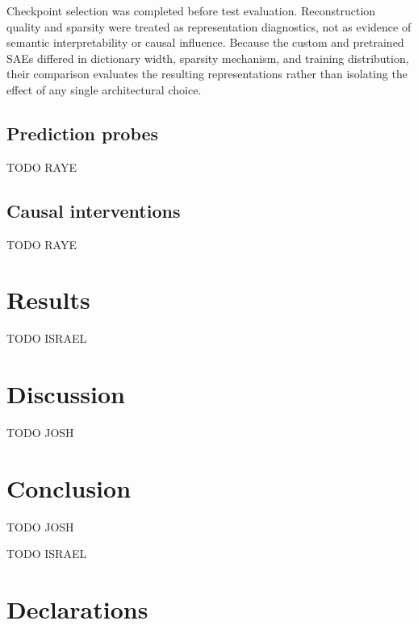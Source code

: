 \documentclass[pdflatex,sn-mathphys-num]{sn-jnl}
\theoremstyle{thmstylethree}%
\begin{document}
Checkpoint selection was completed before test evaluation. Reconstruction quality and sparsity were treated as representation diagnostics, not as evidence of semantic interpretability or 
causal influence. Because the custom and pretrained SAEs differed in dictionary width, sparsity mechanism, and training distribution, their comparison evaluates the resulting representations rather
than isolating the effect of any single architectural choice.

\subsection{Prediction probes}\label{subsec:probes}

TODO RAYE

\subsection{Causal interventions}\label{subsec:interventions}

TODO RAYE

\section{Results}\label{sec:results}

TODO ISRAEL

\section{Discussion}\label{sec:discussion}

TODO JOSH

\section{Conclusion}\label{sec:conclusion}

TODO JOSH

\backmatter


TODO ISRAEL

\section*{Declarations}
\end{document}
